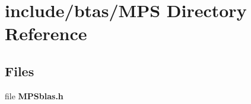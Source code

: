 \section{include/btas/\-M\-P\-S Directory Reference}
\label{dir_f17e3c51e80f2379d719b3a39b672078}
\subsection*{Files}
\begin{DoxyCompactItemize}
\item 
file {\bf M\-P\-Sblas.\-h}
\end{DoxyCompactItemize}
